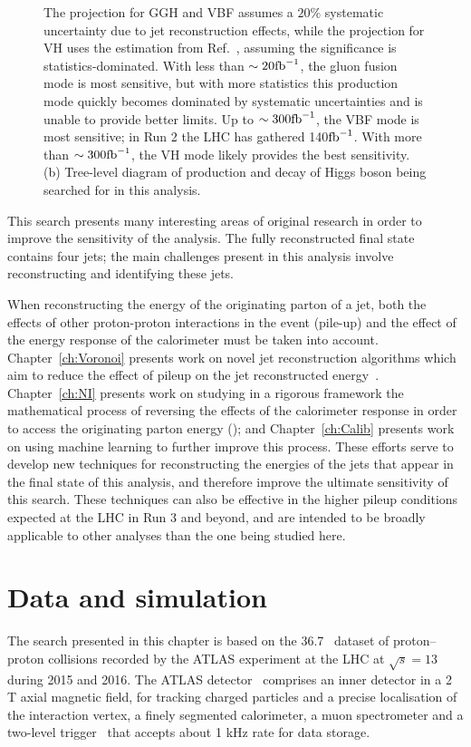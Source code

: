 \begin{figure}[t]
{    The projection for GGH and VBF assumes a $20\%$ systematic uncertainty due to jet reconstruction effects, while the projection for VH uses the estimation from Ref.~\cite{hep-ph/0703247}, assuming the significance is statistics-dominated.
    With less than $\sim 20 \mathrm{fb}^{-1}$, the gluon fusion mode is most sensitive, but with more statistics this production mode quickly becomes dominated by systematic uncertainties and is unable to provide better limits.
    Up to $\sim 300 \mathrm{fb}^{-1}$, the VBF mode is most sensitive; in Run 2 the LHC has gathered 140$\mathrm{fb}^{-1}$.
    With more than $\sim 300 \mathrm{fb}^{-1}$, the VH mode likely provides the best sensitivity.
    (b) Tree-level diagram of production and decay of Higgs boson being searched for in this analysis.
    }
\end{figure}

This search presents many interesting areas of original research in order to improve the sensitivity of the analysis.
The fully reconstructed final state contains four jets;
the main challenges present in this analysis involve reconstructing and identifying these jets.

When reconstructing the energy of the originating parton of a jet, both the effects of other proton-proton interactions in the event (pile-up) and the effect of the energy response of the calorimeter must be taken into account.
Chapter~\ref{ch:Voronoi} presents work on novel jet reconstruction algorithms which aim to reduce the effect of pileup on the jet reconstructed energy~\cite{ATLAS-CONF-2017-065}.
Chapter~\ref{ch:NI} presents work on studying in a rigorous framework the mathematical process of reversing the effects of the calorimeter response in order to access the originating parton energy (\cite{Cukierman:2016dkb});
and Chapter~\ref{ch:Calib} presents work on using machine learning to further improve this process.
These efforts serve to develop new techniques for reconstructing the energies of the jets that appear in the final state of this analysis, and therefore improve the ultimate sensitivity of this search.
These techniques can also be effective in the higher pileup conditions expected at the LHC in Run 3 and beyond, and are intended to be broadly applicable to other analyses than the one being studied here. 

\section{Data and simulation}

The search presented in this chapter is based on the 36.7~\ifb{} dataset of proton--proton collisions
recorded by the ATLAS experiment at the LHC at $\sqrt{s}=13$ \TeV{} during 2015 and 2016.
The ATLAS detector~\cite{PERF-2007-01} comprises an inner detector in a 2 T axial magnetic field, 
for tracking charged particles and a precise localisation of the interaction vertex, 
a finely segmented calorimeter, a muon spectrometer and a two-level trigger~\cite{TRIG-2016-01} that
accepts about 1 kHz rate for data storage.

